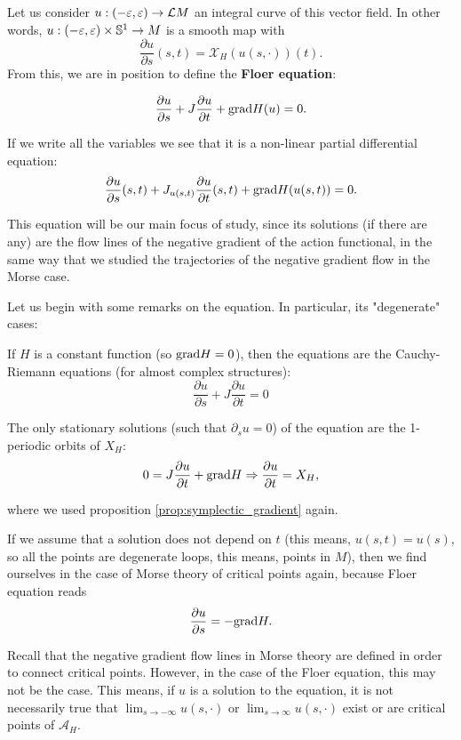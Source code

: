 Let us consider $u : (-\varepsilon,\varepsilon) \rightarrow \mathcal{L}M$ an integral curve of this vector field. In other words, $u : (-\varepsilon,\varepsilon) \times \mathbb{S}^1 \rightarrow M$ is a smooth map with
\[\frac{\partial u}{\partial s} (s,t) = \mathcal{X}_H(u(s,\cdot)) (t) .\]
From this, we are in position to define the {\bf Floer equation}:

\begin{equation} \label{equation:floer_equation}
\frac{\partial u}{\partial s} + J \frac{\partial u}{\partial t} + \mathrm{grad} H(u) = 0 .
\end{equation}

If we write all the variables we see that it is a non-linear partial differential equation:
\[\frac{\partial u}{\partial s}(s,t) + J_{u(s,t)} \frac{\partial u}{\partial t}(s,t) + \mathrm{grad} H(u(s,t)) = 0 .\]

This equation will be our main focus of study, since its solutions (if there are any) are the flow lines of the negative gradient of the action functional, in the same way that we studied the trajectories of the negative gradient flow in the Morse case.

Let us begin with some remarks on the equation. In particular, its "degenerate" cases:

\begin{rmrk}
If $H$ is a constant function (so $\mathrm{grad} H = 0$), then the equations are the Cauchy-Riemann equations (for almost complex structures):
\[\frac{\partial u}{\partial s} + J \frac{\partial u}{\partial t} = 0\]
\end{rmrk}

\begin{rmrk}
The only stationary solutions (such that $\partial_s u = 0$) of the equation are the 1-periodic orbits of $X_H$:
\[0 = J \frac{\partial u}{\partial t} + \mathrm{grad} H \Rightarrow \frac{\partial u}{\partial t} = X_H ,\]

where we used proposition \ref{prop:symplectic_gradient} again.
\end{rmrk}

\begin{rmrk}
If we assume that a solution does not depend on $t$ (this means, $u(s,t) = u(s)$, so all the points are degenerate loops, this means, points in $M$), then we find ourselves in the case of Morse theory of critical points again, because Floer equation reads
\[\frac{\partial u}{\partial s} = - \mathrm{grad} H .\]
\end{rmrk}

Recall that the negative gradient flow lines in Morse theory are defined in order to connect critical points. However, in the case of the Floer equation, this may not be the case. This means, if $u$ is a solution to the equation, it is not necessarily true that $\displaystyle\lim_{s \rightarrow -\infty} u(s,\cdot)$ or $\displaystyle\lim_{s \rightarrow \infty} u(s,\cdot)$ exist or are critical points of $\mathcal{A}_H$.

